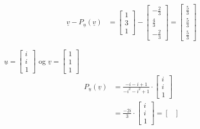 \documentclass[11pt, a4paper, norsk]{NTNUoving}
\begin{document}
\begin{oppgave}
\begin{punkt}
\begin{align*}
                    \underline{v} - P_{\underline{u}}(\underline{v}) &= \begin{bmatrix}
                        1 \\
                        3 \\
                        1
                    \end{bmatrix} - \begin{bmatrix}
                        -\frac{2}{3} \\
                        \frac{4}{3} \\
                        -\frac{2}{3}
                    \end{bmatrix} = \begin{bmatrix}
                        \frac{5}{3} \\
                        \frac{5}{3} \\
                        \frac{5}{3}
                    \end{bmatrix}
            \end{align*}
        \end{punkt}
        \begin{punkt}
           $\underline{u} = \begin{bmatrix}
                i \\
                i \\
                1
            \end{bmatrix}$ og $\underline{v} = \begin{bmatrix}
                1 \\
                1 \\
                1
            \end{bmatrix}$
            \begin{align*}
                P_{\underline{u}}(\underline{v}) &= \frac{-i-i+1}{-i^2-i^2+1} \cdot \begin{bmatrix}
                    i \\
                    i \\
                    1
                \end{bmatrix}
                \\
                         &= \frac{-2i}{3} \cdot \begin{bmatrix}
                             i \\
                             i \\
                             1
                         \end{bmatrix} = \begin{bmatrix}

\end{bmatrix}
\end{align*}
\end{punkt}
\end{oppgave}
\end{document}

